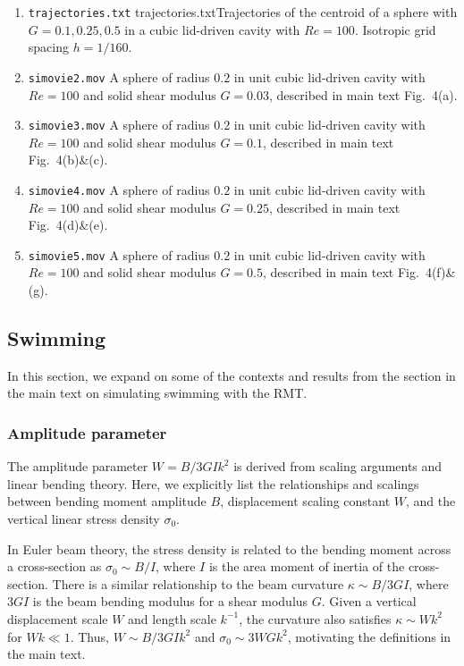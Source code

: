 \documentclass[times, 10pt]{article}
\newcommand{\Rey}{\textit{Re}}
\begin{document}
\begin{enumerate}
		\item \texttt{trajectories.txt} {trajectories.txt}{Trajectories of the centroid of a sphere with $G=0.1, 0.25, 0.5$ in a cubic lid-driven cavity with $Re=100$. Isotropic grid spacing $h=1/160$.}


		\item \texttt{si\textunderscore movie\textunderscore 2.mov} {A sphere of radius $0.2$ in unit cubic lid-driven cavity with $\Rey=100$ and solid shear modulus $G=0.03$, described in main text Fig.~4(a).}

		\item \texttt{si\textunderscore movie\textunderscore 3.mov}  {A sphere of radius $0.2$ in unit cubic lid-driven cavity with $\Rey=100$ and solid shear modulus $G=0.1$, described in main text Fig.~4(b)\&(c).}

		\item \texttt{si\textunderscore movie\textunderscore 4.mov} {A sphere of radius $0.2$ in unit cubic lid-driven cavity with $\Rey=100$ and solid shear modulus $G=0.25$, described in main text Fig.~4(d)\&(e).}

		\item \texttt{si\textunderscore movie\textunderscore 5.mov} {A sphere of radius $0.2$ in unit cubic lid-driven cavity with $\Rey=100$ and solid shear modulus $G=0.5$, described in main text Fig.~4(f)\&(g).}
	\end{enumerate}

    \subsection{Swimming}
        In this section, we expand on some of the contexts and results from the section in the main text on simulating swimming with the RMT.
        
        \subsubsection*{Amplitude parameter} The amplitude parameter $W = B/3GIk^2$ is derived from scaling arguments and linear bending theory.
        Here, we explicitly list the relationships and scalings between bending moment amplitude $B$, displacement scaling constant $W$, and the vertical linear stress density $\sigma_0$.
        
        In Euler beam theory, the stress density is related to the bending moment across a cross-section as $\sigma_0 \sim B/I$, where $I$ is the area moment of inertia of the cross-section.
        There is a similar relationship to the beam curvature $\kappa \sim B/3GI$, where $3GI$ is the beam bending modulus for a shear modulus $G$.
        Given a vertical displacement scale $W$ and length scale $k^{-1}$, the curvature also satisfies $\kappa \sim Wk^2$ for $Wk\ll 1$. Thus, $W \sim B/3GIk^2$ and $\sigma_0 \sim 3WGk^2$, motivating the definitions in the main text.
    
\end{document}
